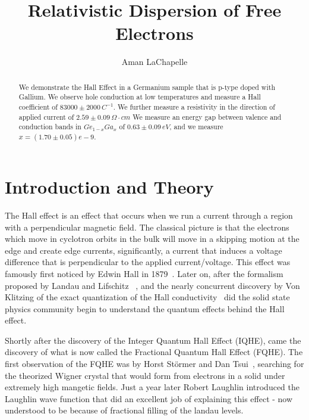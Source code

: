 \documentclass[reprint, nobibnotes, amssymb, amsmath, amsfonts, physics, mathtools, mathrsfs, floatfix]{revtex4-1}
\begin{document}
  \title{Relativistic Dispersion of Free Electrons}

  \author{Aman LaChapelle}

  \begin{abstract}
    We demonstrate the Hall Effect in a Germanium sample that is p-type doped with Gallium.  We observe hole conduction at low temperatures and measure a Hall coefficient of $83000 \pm 2000\,C^{-1}$.  We further measure a resistivity in the direction of applied current of $2.59\pm0.09\,\Omega \cdot cm$  We measure an energy gap between valence and conduction bands in $Ge_{1-x}Ga_x$ of $0.63\pm0.09 \, eV$, and we measure $x = (1.70\pm0.05)e-9$.
  \end{abstract}

  \maketitle
  \tableofcontents

  \section{Introduction and Theory}
    The Hall effect is an effect that occurs when we run a current through a region with a perpendicular magnetic field.  The classical picture is that the electrons which move in cyclotron orbits in the bulk will move in a skipping motion at the edge and create edge currents, significantly, a current that induces a voltage difference that is perpendicular to the applied current/voltage.  This effect was famously first noticed by Edwin Hall in 1879~\cite{classical_hall}.  Later on, after the formalism proposed by Landau and Lifschitz ~\cite{landau}, and the nearly concurrent discovery by Von Klitzing of the exact quantization of the Hall conductivity~\cite{Von_Klitzing} did the solid state physics community begin to understand the quantum effects behind the Hall effect.

    Shortly after the discovery of the Integer Quantum Hall Effect (IQHE), came the discovery of what is now called the Fractional Quantum Hall Effect (FQHE).  The first observation of the FQHE was by Horst St\"{o}rmer and Dan Tsui~\cite{stormer_tsui}, searching for the theorized Wigner crystal that would form from electrons in a solid under extremely high mangetic fields.  Just a year later Robert Laughlin introduced the Laughlin wave function that did an excellent job of explaining this effect - now understood to be because of fractional filling of the landau levels.
\end{document}
